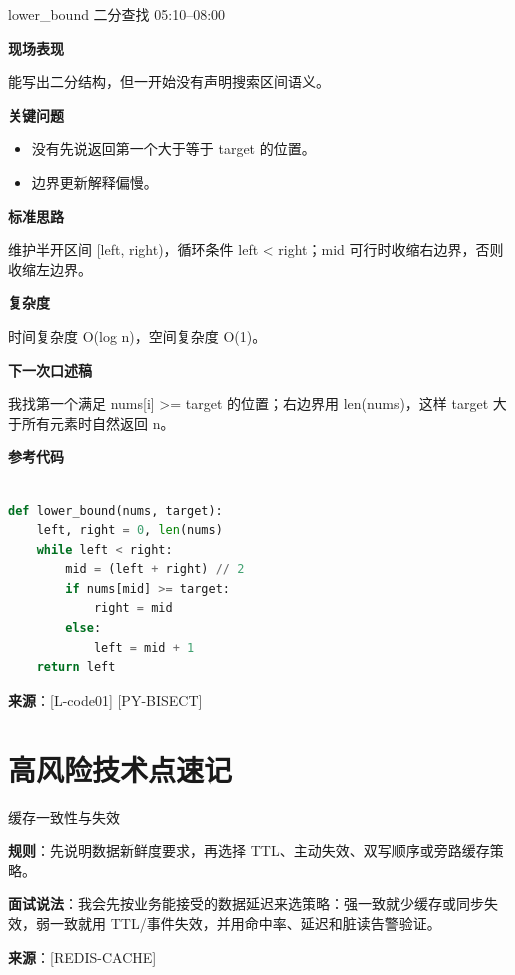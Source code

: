 \documentclass[a4paper,11pt]{article}
\begin{document}
\begin{codebox}{lower\_bound 二分查找 \hfill 05:10--08:00}

\textbf{现场表现}

能写出二分结构，但一开始没有声明搜索区间语义。



\textbf{关键问题}

\begin{itemize}
\item 没有先说返回第一个大于等于 target 的位置。
\item 边界更新解释偏慢。
\end{itemize}



\textbf{标准思路}

维护半开区间 [left, right)，循环条件 left < right；mid 可行时收缩右边界，否则收缩左边界。



\textbf{复杂度}

时间复杂度 O(log n)，空间复杂度 O(1)。



\textbf{下一次口述稿}

我找第一个满足 nums[i] >= target 的位置；右边界用 len(nums)，这样 target 大于所有元素时自然返回 n。



\textbf{参考代码}

\begin{lstlisting}[language=Python]

def lower_bound(nums, target):
    left, right = 0, len(nums)
    while left < right:
        mid = (left + right) // 2
        if nums[mid] >= target:
            right = mid
        else:
            left = mid + 1
    return left

\end{lstlisting}

\textbf{来源}：[L-code01] [PY-BISECT]

\end{codebox}

\section{高风险技术点速记}

\begin{drillbox}{缓存一致性与失效}

\textbf{规则}：先说明数据新鲜度要求，再选择 TTL、主动失效、双写顺序或旁路缓存策略。



\textbf{面试说法}：我会先按业务能接受的数据延迟来选策略：强一致就少缓存或同步失效，弱一致就用 TTL/事件失效，并用命中率、延迟和脏读告警验证。



\textbf{来源}：[REDIS-CACHE]

\end{drillbox}
\end{document}
